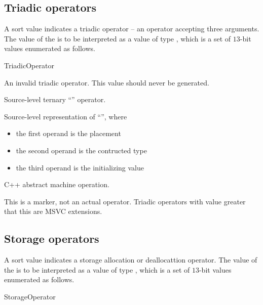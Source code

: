 \subsection{Triadic operators}
\label{sec:ifc:OperatorSort:Triadic}

A sort value  indicates a triadic operator -- 
an operator accepting three arguments.  The
value of the  is to be interpreted as a value of type 
, which is a set of $13$-bit values enumerated as follows.
%
\begin{Enumeration}{TriadicOperator}

	\setcounter{enumi}{1023}
\end{Enumeration}

An invalid triadic operator.  This value should never be generated.

Source-level ternary ``'' operator.

Source-level representation of ``'', where
\begin{itemize}
	\item the first operand is the placement 
	\item the second operand is the contructed type 
	\item the third operand is the initializing value 
\end{itemize}


C++ abstract machine operation.

This is a marker, not an actual operator. Triadic operators with 
value greater that this are MSVC extensions.


\subsection{Storage operators}
\label{sec:ifc:OperatorSort:Storage}

A sort value  indicates a storage 
allocation or deallocattion operator.  The
value of the  is to be interpreted as a value of type 
, which is a set of $13$-bit values enumerated as follows.
%
\begin{Enumeration}{StorageOperator}

	\setcounter{enumi}{2013}
\end{Enumeration}

